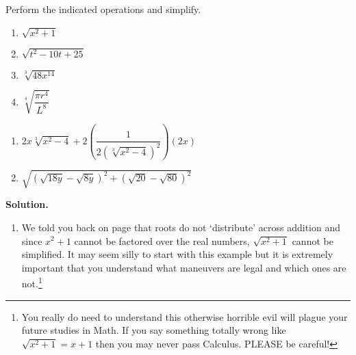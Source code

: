\documentclass{ximera}
\begin{document}
{\begin{example}\label{simplifyradexpressions}  Perform the indicated operations and simplify.

\begin{multicols}{4}

\begin{enumerate}

\item  $\sqrt{x^{2} + 1}$

\item  $\sqrt{t^2-10t+25}$

\item  $\sqrt[3]{48x^{14}}$

\item  $\sqrt[4]{\dfrac{\pi r^{4}}{L^{8}}}$


\setcounter{HW}{\value{enumi}}

\end{enumerate}

\end{multicols}

\begin{multicols}{2}

\begin{enumerate}
\setcounter{enumi}{\value{HW}}

\item $2x \sqrt[3]{x^2-4} + 2\left(\dfrac{1}{2(\sqrt[3]{x^2-4})^2}\right)  (2x)$ 

\item  $\sqrt{(\sqrt{18y} - \sqrt{8y})^2 + (\sqrt{20} - \sqrt{80})^2}$ 

\end{enumerate}

\end{multicols}

{\bf Solution.}

\begin{enumerate}

\item We told you back on page \pageref{donotdistributeexponents} that roots do not `distribute' across addition and since $x^{2} + 1$ cannot be factored over the real numbers, $\sqrt{x^{2} + 1}$ cannot be simplified.  It may seem silly to start with this example but it is extremely important that you understand what maneuvers are legal and which ones are not.\footnote{You really do need to understand this otherwise horrible evil will plague your future studies in Math.  If you say something totally wrong like $\sqrt{x^{2} + 1} = x + 1$ then you may never pass Calculus.  PLEASE be careful!}


\end{enumerate}
\end{example}}
\end{document}
